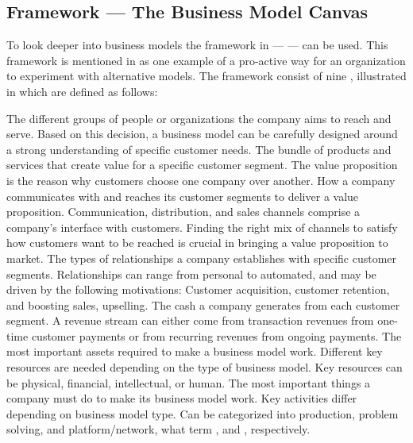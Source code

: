 \subsection{Framework --- The Business Model Canvas} 
\label{section:businessmodels:canvas}

To look deeper into business models the framework in \citet{osterwalder2010} ---  --- can be used. This framework is mentioned in \citet{chesbrough2010} as one example of a pro-active way for an organization to experiment with alternative models. The framework consist of nine , illustrated in which are defined as follows:

\begin{items}
   The different groups of people or organizations the company aims to reach and serve. Based on this decision, a business model can be carefully designed around a strong understanding of specific customer needs.
   The bundle of products and services that create value for a specific customer segment. The value proposition is the reason why customers choose one company over another.
   How a company communicates with and reaches its customer segments to deliver a value proposition. Communication, distribution, and sales channels comprise a company's interface with customers. Finding the right mix of channels to satisfy how customers want to be reached is crucial in bringing a value proposition to market.
   The types of relationships a company establishes with specific customer segments. Relationships can range from personal to automated, and may be driven by the following motivations: Customer acquisition, customer retention, and boosting sales, \ie upselling.
   The cash a company generates from each customer segment. A revenue stream can either come from transaction revenues from one-time customer payments or from recurring revenues from ongoing payments.
   The most important assets required to make a business model work. Different key resources are needed depending on the type of business model. Key resources can be physical, financial, intellectual, or human.
   The most important things a company must do to make its business model work. Key activities differ depending on business model type. Can be categorized into production, problem solving, and platform/network, \ie what \citet{stabell1998} term ,  and , respectively.

\end{items}
